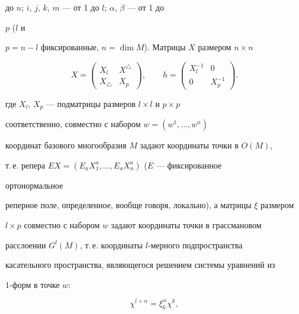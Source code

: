 до $n$; $i$, $j$, $k$, $m$ --- от 1 до $l$; $\alpha$, $\beta$ --- от 1 до


$p$ ($l$ и


$p=n-l$ фиксированные, $n=\dim M$). Матрицы $X$ размером $n\times n$


\begin{equation}


X=


\begin{pmatrix}


X_l & X^\triangle \\


X_\triangle & X_p


\end{pmatrix}


,\qquad


h=


\begin{pmatrix}


X^{-1}_l & 0\\


0 & X^{-1}_p


\end{pmatrix}


.


\end{equation}


где $X_l$, $X_p$ --- подматрицы размеров $l\times l$ и $p\times p$


соответственно, совместно с набором $w=(w^1,\dotsc,w^n)$


координат базового многообразия $M$ задают координаты точки в $O(M)$,


т.\,е. репера $EX=(E_aX^a_1,\dotsc,E_aX^a_n)$ ($E$ --- фиксированное


ортонормальное


реперное поле, определенное, вообще говоря, локально), а матрицы $\xi $ размером


$l\times p$ совместно с набором $w$ задают координаты точки в грассмановом


расслоении $G^l (M)$, т.\,е. координаты $l$-мерного подпространства


касательного пространства, являющегося решением системы уравнений из


1-форм в точке $w$:


\begin{equation}


\chi ^{l+\alpha }=\xi ^\alpha _k \chi ^k,


\end{equation}



